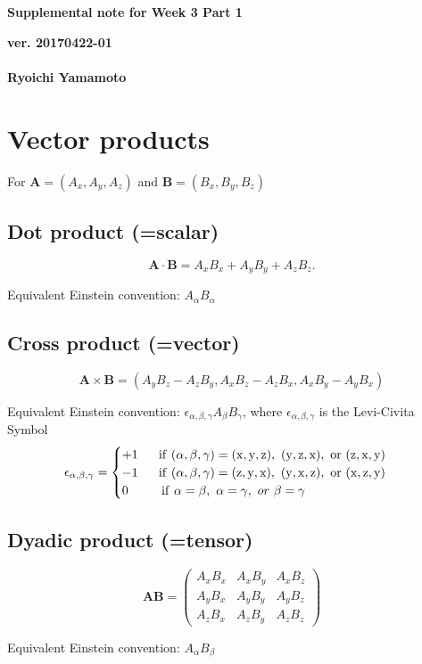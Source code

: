\documentclass[a4paper,11pt]{article}
\begin{document}
\begin{center}
  {\LARGE\bf Supplemental note for Week 3 Part 1}
  \end{center}
\begin{flushright}
  {\large\bf ver. 20170422-01}\\
 \ \\
{\large\bf Ryoichi Yamamoto}\\
\end{flushright}

\section{Vector products}

For $\mathbf{A}=(A_x, A_y,A_z)$ and  $\mathbf{B}=(B_x, B_y,B_z)$

\subsection{Dot product (=scalar)}

$$
\mathbf{A}\cdot\mathbf{B}=A_xB_x+A_yB_y+A_zB_z.
$$

Equivalent Einstein convention: $A_\alpha B_\alpha$

\subsection{Cross product (=vector)}

$$
\mathbf{A}\times\mathbf{B}=(
      A_yB_z -  A_zB_y ,
      A_xB_z -  A_zB_x ,
      A_xB_y -  A_yB_x 
)
$$

Equivalent Einstein convention: $\epsilon_{\alpha,\beta,\gamma}A_\beta B_\gamma$, where $\epsilon_{\alpha,\beta,\gamma}$ is the Levi-Civita Symbol
$$
\epsilon_{\alpha,\beta,\gamma}=
\begin{cases}
    +1\ \ \ \ \ {\rm if\ ({\it \alpha,\beta,\gamma})=(x,y,z),\ (y,z,x),\ or\ (z,x,y)}\\
    -1 \ \ \ \ \ {\rm if\ ({\it \alpha,\beta,\gamma})=(z,y,x),\ (y,x,z),\ or\ (x,z,y)}\\
    0\ \ \ \ \ \ \ \ {\rm if}\ \alpha=\beta,\ \alpha=\gamma,\ or\ \beta=\gamma
\end{cases}
$$

\subsection{Dyadic product (=tensor)}

$$
\mathbf{A}\mathbf{B}=\left(
\begin{array}{ccc}
      A_xB_x & A_xB_y & A_xB_z \\
      A_yB_x & A_yB_y & A_yB_z \\
      A_zB_x & A_zB_y & A_zB_z
\end{array}\right)
$$

Equivalent Einstein convention: $A_\alpha B_\beta$
\end{document}
